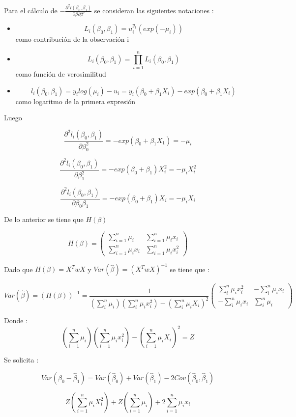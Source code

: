\documentclass[]{article}
\providecommand{\tightlist}{%
  \setlength{\itemsep}{0pt}\setlength{\parskip}{0pt}}
\begin{document}
Para el cálculo de
\(-\frac{\partial^2 l(\beta_0,\beta_1)}{\partial \beta \partial\beta'}\)
se consideran las siguientes notaciones :

\begin{itemize}
\tightlist
\item
  \[L_i(\beta_0,\beta_1) = u^{y_1}_i(exp(-\mu_i))\] como contribución de
  la observación i
\item
  \[L_i(\beta_0,\beta_1) = \prod^n_{i=1} L_i(\beta_0,\beta_1)\] como
  función de verosimilitud
\item
  \[l_i(\beta_0,\beta_1) = y_i log(\mu_i) - u_i = y_i(\beta_0+\beta_1 X_i) - exp(\beta_0+\beta_1 X_i)\]
  como logaritmo de la primera expresión
\end{itemize}

Luego

\[\frac{\partial^2 l_i(\beta_0,\beta_1)}{\partial \beta^2_0} = -exp(\beta_0+\beta_1 X_1) = - \mu_i\]

\[\frac{\partial^2 l_i(\beta_0,\beta_1)}{\partial \beta^2_1} = -exp(\beta_0+\beta_1) X^2_i = - \mu_i X^2_i\]

\[\frac{\partial^2 l_i(\beta_0,\beta_1)}{\partial \beta_0 \beta_1} = -exp(\beta_0+\beta_1) X_i = - \mu_i X_i\]

De lo anterior se tiene que \(H(\beta)\)

\[H(\beta) = \left(\begin{array}{cc} \sum^n_{i=1} \mu_i & \sum^n_{i=1} \mu_i x_i\\ \sum^n_{i=1} \mu_i x_i & \sum^n_{i=1} \mu_i x^2_i \end{array}\right)\]

Dado que \(H(\beta)=X^TwX\) y \(Var(\hat\beta)=(X^TwX)^{-1}\) se tiene
que :

\[Var(\hat\beta)=(H(\beta))^{-1} = \frac{1}{(\sum^n_i \mu_i)(\sum^n_i \mu_i x^2_i)- 
(\sum^n_i \mu_i X_i)^2} \left(\begin{array}{cc} \sum^n_i \mu_i  x^2_i& - \sum^n_i \mu_i x_i\\ - \sum^n_i \mu_i x_i & \sum^n_i \mu_i \end{array}\right)\]

Donde :
\[(\sum^n_{i=1} \mu_i)(\sum^n_{i=1} \mu_i x^2_i)-(\sum^n_{i=1} \mu_i X_i)^2 = Z\]

Se solicita :

\[Var(\hat\beta_0 - \hat\beta_1)= Var(\hat\beta_0) + Var(\hat\beta_1) - 2 Cov(\hat\beta_0,\hat\beta_1)\]

\[Z(\sum^n_{i=1} \mu_i X^2_i) + Z(\sum^n_{i=1} \mu_i) + 2 \sum^n_{i=1} \mu_i x_i \]
\end{document}
